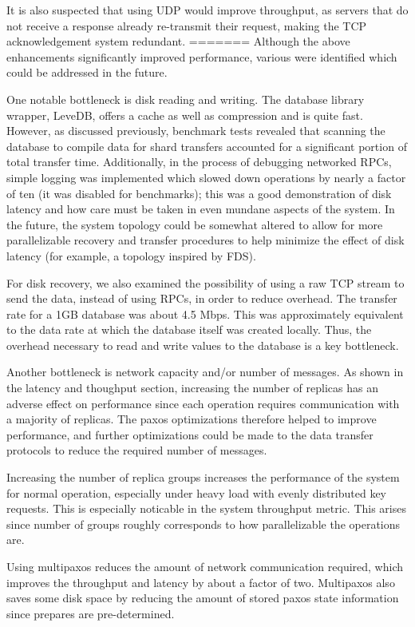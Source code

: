 \documentclass[letterpaper,10pt]{article}
\begin{document}
\begin{itemize}
It is also suspected that using UDP would improve throughput, as servers that do not receive a response already re-transmit their request, making the TCP acknowledgement system redundant.
=======
Although the above enhancements significantly improved performance,
various were identified which could be addressed in the future.

One notable bottleneck is disk reading and writing.  The database
library wrapper, LeveDB, offers a cache as well as compression and is
quite fast.  However, as discussed previously, benchmark tests
revealed that scanning the database to compile data for shard
transfers accounted for a significant portion of total transfer time.
Additionally, in the process of debugging networked RPCs, simple
logging was implemented which slowed down operations by nearly a
factor of ten (it was disabled for benchmarks); this was a good
demonstration of disk latency and how care must be taken in even
mundane aspects of the system.  In the future, the system topology
could be somewhat altered to allow for more parallelizable recovery
and transfer procedures to help minimize the effect of disk latency
(for example, a topology inspired by FDS).

For disk recovery, we also examined the possibility of using a raw TCP
stream to send the data, instead of using RPCs, in order to reduce
overhead. The transfer rate for a 1GB database was about 4.5
Mbps. This was approximately equivalent to the data rate at which the
database itself was created locally. Thus, the overhead necessary to
read and write values to the database is a key bottleneck. 

Another bottleneck is network capacity and/or number of messages.  As
shown in the latency and thoughput section, increasing the number of
replicas has an adverse effect on performance since each operation
requires communication with a majority of replicas.  The paxos
optimizations therefore helped to improve performance, and further
optimizations could be made to the data transfer protocols to reduce
the required number of messages.

Increasing the number of replica groups increases the performance of
the system for normal operation, especially under heavy load with
evenly distributed key requests. This is especially noticable in the
system throughput metric.  This arises since number of groups roughly
corresponds to how parallelizable the operations are.

Using multipaxos reduces the amount of network communication required,
which improves the throughput and latency by about a factor of
two. Multipaxos also saves some disk space by reducing the amount of
stored paxos state information since prepares are pre-determined.


\end{itemize}
\end{document}
